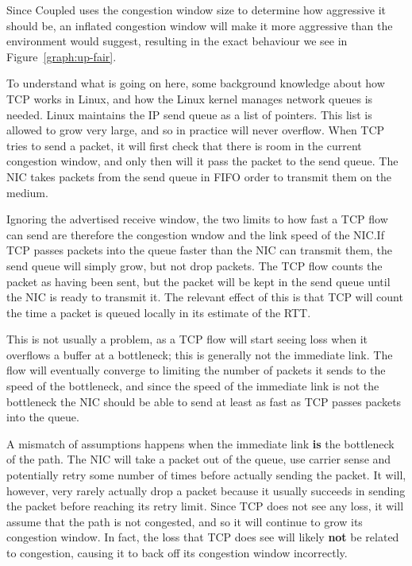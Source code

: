 Since Coupled uses the congestion window size to determine how aggressive it
should be, an inflated congestion window will make it more aggressive than the 
environment would suggest, resulting in the exact behaviour we see in
Figure~\ref{graph:up-fair}.

To understand what is going on here, some background knowledge about how TCP
works in Linux, and how the Linux kernel manages network queues is needed. Linux
maintains the IP send queue as a list of pointers. This list is allowed to grow
very large, and so in practice will never overflow. When TCP tries to send a
packet, it will first check that there is room in the current congestion window,
and only then will it pass the packet to the send queue. The NIC takes packets 
from the send queue in FIFO order to transmit them on the medium.

Ignoring the advertised receive window, the two limits to how fast a TCP flow
can send are therefore the congestion wndow and the link speed of the NIC.\@ If
TCP passes packets into the queue faster than the NIC can transmit them, the
send queue will simply grow, but not drop packets. The TCP flow counts the
packet as having been sent, but the packet will be kept in the send queue until
the NIC is ready to transmit it. The relevant effect of this is that TCP will
count the time a packet is queued locally in its estimate of the RTT.

This is not usually a problem, as a TCP flow will start seeing loss when it
overflows a buffer at a bottleneck; this is generally not the immediate link.
The flow will eventually converge to limiting the number of packets it sends to
the speed of the bottleneck, and since the speed of the immediate link is not
the bottleneck the NIC should be able to send at least as fast as TCP passes
packets into the queue.

A mismatch of assumptions happens when the immediate link \textbf{is} the 
bottleneck of the path. The NIC will take a packet out of the queue, use carrier 
sense and potentially retry some number of times before actually sending the 
packet. It will, however, very rarely actually drop a packet because it usually 
succeeds in sending the packet before reaching its retry limit. Since TCP does 
not see any loss, it will assume that the path is not congested, and so it will 
continue to grow its congestion window.  In fact, the loss that TCP does see 
will likely \textbf{not} be related to congestion, causing it to back off its 
congestion window incorrectly. %

